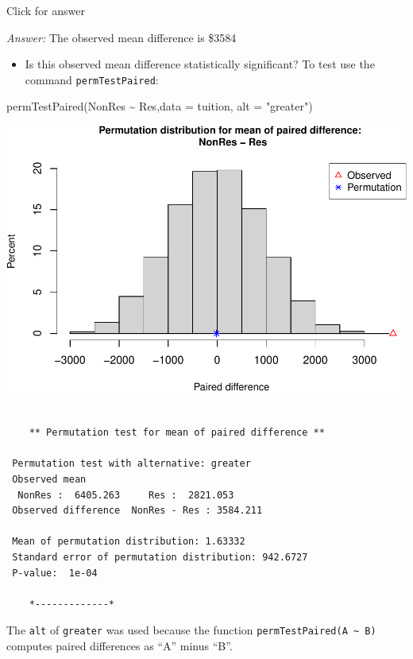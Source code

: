 \documentclass[
]{book}
\newenvironment{Shaded}{\begin{snugshade}}{\end{snugshade}}
\newcommand{\AttributeTok}[1]{\textcolor[rgb]{0.77,0.63,0.00}{#1}}
\newcommand{\FunctionTok}[1]{\textcolor[rgb]{0.00,0.00,0.00}{#1}}
\newcommand{\NormalTok}[1]{#1}
\newcommand{\SpecialCharTok}[1]{\textcolor[rgb]{0.00,0.00,0.00}{#1}}
\newcommand{\StringTok}[1]{\textcolor[rgb]{0.31,0.60,0.02}{#1}}
\providecommand{\tightlist}{%
  \setlength{\itemsep}{0pt}\setlength{\parskip}{0pt}}
\begin{document}
Click for answer

\emph{Answer:} The observed mean difference is \$3584

\begin{itemize}
\tightlist
\item
  Is this observed mean difference statistically significant? To test use the command \texttt{permTestPaired}:
\end{itemize}

\begin{Shaded}
\begin{Highlighting}[]
\FunctionTok{permTestPaired}\NormalTok{(NonRes }\SpecialCharTok{\textasciitilde{}}\NormalTok{ Res,}\AttributeTok{data =}\NormalTok{ tuition, }\AttributeTok{alt =} \StringTok{"greater"}\NormalTok{)}
\end{Highlighting}
\end{Shaded}

\includegraphics[width=1\linewidth]{Class_Activity_13_files/figure-latex/unnamed-chunk-5-1}

\begin{verbatim}

    ** Permutation test for mean of paired difference **

 Permutation test with alternative: greater 
 Observed mean
  NonRes :  6405.263     Res :  2821.053 
 Observed difference  NonRes - Res : 3584.211 

 Mean of permutation distribution: 1.63332 
 Standard error of permutation distribution: 942.6727 
 P-value:  1e-04 

    *-------------*
\end{verbatim}

The \texttt{alt} of \texttt{greater} was used because the function \texttt{permTestPaired(A\ \textasciitilde{}\ B)} computes paired differences as ``A'' minus ``B''.
\end{document}

